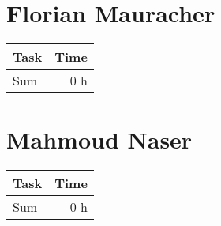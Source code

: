 \clearpage
\section*{Florian Mauracher}
\begin{table}[h!tpb]
  \centering
  \begin{tabularx}{\textwidth}{X r}
    \toprule
      Task & Time \\
    \midrule
    \midrule
      Sum & 0 h \\
    \bottomrule
  \end{tabularx}
\end{table}

\clearpage
\section*{Mahmoud Naser}
\begin{table}[h!tpb]
  \centering
  \begin{tabularx}{\textwidth}{X r}
    \toprule
      Task & Time \\
    \midrule
    \midrule
      Sum & 0 h \\
    \bottomrule
  \end{tabularx}
\end{table}

